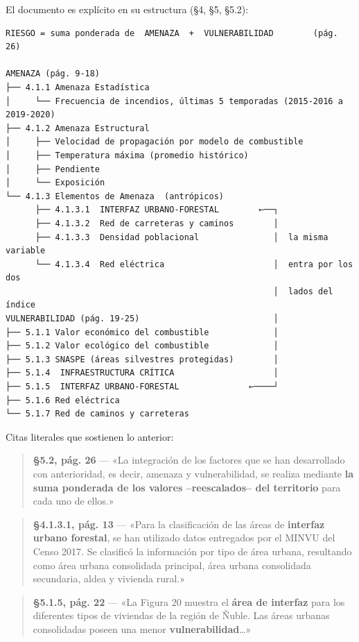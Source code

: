 \documentclass[
  spanish,
  10pt,
]{article}
\begin{document}
El documento es explícito en su estructura (§4, §5, §5.2):

\begin{verbatim}
RIESGO = suma ponderada de  AMENAZA  +  VULNERABILIDAD        (pág. 26)

AMENAZA (pág. 9-18)
├── 4.1.1 Amenaza Estadística
│     └── Frecuencia de incendios, últimas 5 temporadas (2015-2016 a 2019-2020)
├── 4.1.2 Amenaza Estructural
│     ├── Velocidad de propagación por modelo de combustible
│     ├── Temperatura máxima (promedio histórico)
│     ├── Pendiente
│     └── Exposición
└── 4.1.3 Elementos de Amenaza  (antrópicos)
      ├── 4.1.3.1  INTERFAZ URBANO-FORESTAL        ←──┐
      ├── 4.1.3.2  Red de carreteras y caminos        │
      ├── 4.1.3.3  Densidad poblacional               │  la misma variable
      └── 4.1.3.4  Red eléctrica                      │  entra por los dos
                                                      │  lados del índice
VULNERABILIDAD (pág. 19-25)                           │
├── 5.1.1 Valor económico del combustible             │
├── 5.1.2 Valor ecológico del combustible             │
├── 5.1.3 SNASPE (áreas silvestres protegidas)        │
├── 5.1.4  INFRAESTRUCTURA CRÍTICA                    │
├── 5.1.5  INTERFAZ URBANO-FORESTAL              ←────┘
├── 5.1.6 Red eléctrica
└── 5.1.7 Red de caminos y carreteras
\end{verbatim}

Citas literales que sostienen lo anterior:

\begin{quote}
\textbf{§5.2, pág. 26} --- «La integración de los factores que se han
desarrollado con anterioridad, es decir, amenaza y vulnerabilidad, se
realiza mediante \textbf{la suma ponderada de los valores
--reescalados-- del territorio} para cada uno de ellos.»
\end{quote}

\begin{quote}
\textbf{§4.1.3.1, pág. 13} --- «Para la clasificación de las áreas de
\textbf{interfaz urbano forestal}, se han utilizado datos entregados por
el MINVU del Censo 2017. Se clasificó la información por tipo de área
urbana, resultando como área urbana consolidada principal, área urbana
consolidada secundaria, aldea y vivienda rural.»
\end{quote}

\begin{quote}
\textbf{§5.1.5, pág. 22} --- «La Figura 20 muestra el \textbf{área de
interfaz} para los diferentes tipos de viviendas de la región de Ñuble.
Las áreas urbanas consolidadas poseen una menor
\textbf{vulnerabilidad}\ldots»
\end{quote}
\end{document}
